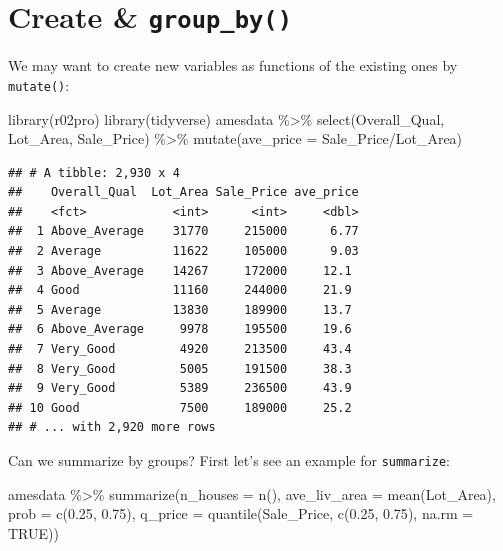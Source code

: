 \documentclass[
]{book}
\newenvironment{Shaded}{\begin{snugshade}}{\end{snugshade}}
\newcommand{\AttributeTok}[1]{\textcolor[rgb]{0.77,0.63,0.00}{#1}}
\newcommand{\ConstantTok}[1]{\textcolor[rgb]{0.00,0.00,0.00}{#1}}
\newcommand{\FloatTok}[1]{\textcolor[rgb]{0.00,0.00,0.81}{#1}}
\newcommand{\FunctionTok}[1]{\textcolor[rgb]{0.00,0.00,0.00}{#1}}
\newcommand{\NormalTok}[1]{#1}
\newcommand{\SpecialCharTok}[1]{\textcolor[rgb]{0.00,0.00,0.00}{#1}}
\theoremstyle{definition}
\theoremstyle{definition}
\theoremstyle{definition}
\theoremstyle{definition}
\theoremstyle{remark}
\begin{document}
\hypertarget{create-group_by}{%
\section{\texorpdfstring{Create \& \texttt{group\_by()}}{Create \& group\_by()}}\label{create-group_by}}

We may want to create new variables as functions of the existing ones by \texttt{mutate()}:

\begin{Shaded}
\begin{Highlighting}[]
\FunctionTok{library}\NormalTok{(r02pro)}
\FunctionTok{library}\NormalTok{(tidyverse)}
\NormalTok{amesdata }\SpecialCharTok{\%\textgreater{}\%} 
  \FunctionTok{select}\NormalTok{(Overall\_Qual, Lot\_Area, Sale\_Price) }\SpecialCharTok{\%\textgreater{}\%}
  \FunctionTok{mutate}\NormalTok{(}\AttributeTok{ave\_price =}\NormalTok{ Sale\_Price}\SpecialCharTok{/}\NormalTok{Lot\_Area) }
\end{Highlighting}
\end{Shaded}

\begin{verbatim}
## # A tibble: 2,930 x 4
##    Overall_Qual  Lot_Area Sale_Price ave_price
##    <fct>            <int>      <int>     <dbl>
##  1 Above_Average    31770     215000      6.77
##  2 Average          11622     105000      9.03
##  3 Above_Average    14267     172000     12.1 
##  4 Good             11160     244000     21.9 
##  5 Average          13830     189900     13.7 
##  6 Above_Average     9978     195500     19.6 
##  7 Very_Good         4920     213500     43.4 
##  8 Very_Good         5005     191500     38.3 
##  9 Very_Good         5389     236500     43.9 
## 10 Good              7500     189000     25.2 
## # ... with 2,920 more rows
\end{verbatim}

Can we summarize by groups? First let's see an example for \texttt{summarize}:

\begin{Shaded}
\begin{Highlighting}[]
\NormalTok{amesdata }\SpecialCharTok{\%\textgreater{}\%} 
  \FunctionTok{summarize}\NormalTok{(}\AttributeTok{n\_houses =} \FunctionTok{n}\NormalTok{(),}
            \AttributeTok{ave\_liv\_area =} \FunctionTok{mean}\NormalTok{(Lot\_Area),}
            \AttributeTok{prob =} \FunctionTok{c}\NormalTok{(}\FloatTok{0.25}\NormalTok{, }\FloatTok{0.75}\NormalTok{),}
            \AttributeTok{q\_price =} \FunctionTok{quantile}\NormalTok{(Sale\_Price, }\FunctionTok{c}\NormalTok{(}\FloatTok{0.25}\NormalTok{, }\FloatTok{0.75}\NormalTok{),}
                               \AttributeTok{na.rm =} \ConstantTok{TRUE}\NormalTok{))}
\end{Highlighting}
\end{Shaded}
\end{document}
